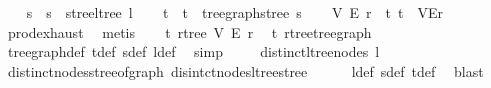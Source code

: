 \begin{isabellebody}
\ \ \isamarkupfalse%
\ s{\isacharprime}{\kern0pt}\ \ {\isachardoublequoteopen}s{\isacharprime}{\kern0pt}\ {\isacharequal}{\kern0pt}\ stree{\isacharunderscore}{\kern0pt}ltree\ l{\isacharprime}{\kern0pt}{\isachardoublequoteclose}\isanewline
\ \ \isamarkupfalse%
\ t{\isacharprime}{\kern0pt}\ \ {\isachardoublequoteopen}t{\isacharprime}{\kern0pt}\ {\isacharequal}{\kern0pt}\ tree{\isacharunderscore}{\kern0pt}graph{\isacharunderscore}{\kern0pt}stree\ s{\isacharprime}{\kern0pt}{\isachardoublequoteclose}\isanewline
\ \ \isamarkupfalse%
\ V{\isacharprime}{\kern0pt}\ E{\isacharprime}{\kern0pt}\ r{\isacharprime}{\kern0pt}\ \ t{\isacharprime}{\kern0pt}{\isacharcolon}{\kern0pt}\ {\isachardoublequoteopen}t{\isacharprime}{\kern0pt}\ {\isacharequal}{\kern0pt}\ {\isacharparenleft}{\kern0pt}V{\isacharprime}{\kern0pt}{\isacharcomma}{\kern0pt}E{\isacharprime}{\kern0pt}{\isacharcomma}{\kern0pt}r{\isacharprime}{\kern0pt}{\isacharparenright}{\kern0pt}{\isachardoublequoteclose}\ \isamarkupfalse%
\ prod{\isachardot}{\kern0pt}exhaust\ \isamarkupfalse%
\ metis\isanewline
\ \ \isamarkupfalse%
\ t{\isacharprime}{\kern0pt}{\isacharcolon}{\kern0pt}\ rtree\ V{\isacharprime}{\kern0pt}\ E{\isacharprime}{\kern0pt}\ r{\isacharprime}{\kern0pt}\ \isamarkupfalse%
\ t{\isacharprime}{\kern0pt}\ rtree{\isacharunderscore}{\kern0pt}tree{\isacharunderscore}{\kern0pt}graph\ \isamarkupfalse%
\ tree{\isacharunderscore}{\kern0pt}graph{\isacharunderscore}{\kern0pt}def\ t{\isacharprime}{\kern0pt}{\isacharunderscore}{\kern0pt}def\ s{\isacharprime}{\kern0pt}{\isacharunderscore}{\kern0pt}def\ l{\isacharprime}{\kern0pt}{\isacharunderscore}{\kern0pt}def\ \isamarkupfalse%
\ simp\ \isanewline
\ \ \isamarkupfalse%
\ {\isachardoublequoteopen}distinct{\isacharunderscore}{\kern0pt}ltree{\isacharunderscore}{\kern0pt}nodes\ l{\isachardoublequoteclose}\ \isamarkupfalse%
\ distinct{\isacharunderscore}{\kern0pt}nodes{\isacharunderscore}{\kern0pt}stree{\isacharunderscore}{\kern0pt}of{\isacharunderscore}{\kern0pt}graph\ disintct{\isacharunderscore}{\kern0pt}nodes{\isacharunderscore}{\kern0pt}ltree{\isacharunderscore}{\kern0pt}stree\isanewline
\ \ \ \ \isamarkupfalse%
\ l{\isacharunderscore}{\kern0pt}def\ s{\isacharunderscore}{\kern0pt}def\ t{\isacharunderscore}{\kern0pt}def\ \isamarkupfalse%
\ blast\isanewline
\ \ \isamarkupfalse%

\end{isabellebody}

